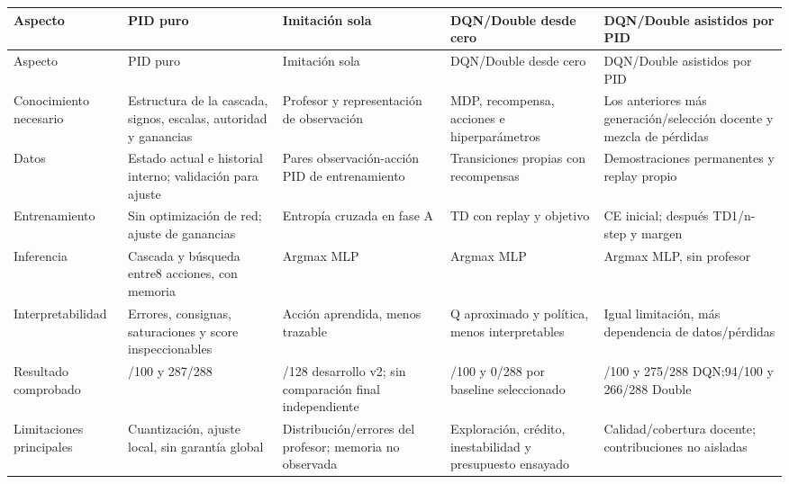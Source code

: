 \documentclass[12pt,a4paper]{article}
\begin{document}
\begingroup
\setlength{\tabcolsep}{3pt}
\renewcommand{\arraystretch}{1.35}
\fontsize{9.1}{11.8}\selectfont
\begin{longtable}{>{\raggedright\arraybackslash}p{0.2400\dimexpr\linewidth-30pt\relax}>{\raggedright\arraybackslash}p{0.1900\dimexpr\linewidth-30pt\relax}>{\raggedright\arraybackslash}p{0.1900\dimexpr\linewidth-30pt\relax}>{\raggedright\arraybackslash}p{0.1900\dimexpr\linewidth-30pt\relax}>{\raggedright\arraybackslash}p{0.1900\dimexpr\linewidth-30pt\relax}}
\toprule
\rowcolor{Pale}Aspecto & PID puro & Imitación sola & DQN/\allowbreak{}Double desde cero & DQN/\allowbreak{}Double asistidos por PID \\
\midrule
\endfirsthead
\toprule
\rowcolor{Pale}Aspecto & PID puro & Imitación sola & DQN/\allowbreak{}Double desde cero & DQN/\allowbreak{}Double asistidos por PID \\
\midrule
\endhead
\bottomrule\endfoot
Conocimiento necesario & Estructura de la cascada,\allowbreak{} signos,\allowbreak{} escalas,\allowbreak{} autoridad y ganancias & Profesor y representación de observación & MDP,\allowbreak{} recompensa,\allowbreak{} acciones e hiperparámetros & Los anteriores más generación/\allowbreak{}selección docente y mezcla de pérdidas \\
Datos & Estado actual e historial interno; validación para ajuste & Pares observación-acción PID de entrenamiento & Transiciones propias con recompensas & Demostraciones permanentes y replay propio \\
Entrenamiento & Sin optimización de red; ajuste de ganancias & Entropía cruzada en fase A & TD con replay y objetivo & CE inicial; después TD1/\allowbreak{}n-step y margen \\
Inferencia & Cascada y búsqueda entre8 acciones,\allowbreak{} con memoria & Argmax MLP & Argmax MLP & Argmax MLP,\allowbreak{} sin profesor \\
Interpretabilidad & Errores,\allowbreak{} consignas,\allowbreak{} saturaciones y score inspeccionables & Acción aprendida,\allowbreak{} menos trazable & Q aproximado y política,\allowbreak{} menos interpretables & Igual limitación,\allowbreak{} más dependencia de datos/\allowbreak{}pérdidas \\
Resultado comprobado & 98/\allowbreak{}100 y 287/\allowbreak{}288 & 119/\allowbreak{}128 desarrollo v2; sin comparación final independiente & 0/\allowbreak{}100 y 0/\allowbreak{}288 por baseline seleccionado & 96/\allowbreak{}100 y 275/\allowbreak{}288 DQN;94/\allowbreak{}100 y 266/\allowbreak{}288 Double \\
Limitaciones principales & Cuantización,\allowbreak{} ajuste local,\allowbreak{} sin garantía global & Distribución/\allowbreak{}errores del profesor; memoria no observada & Exploración,\allowbreak{} crédito,\allowbreak{} inestabilidad y presupuesto ensayado & Calidad/\allowbreak{}cobertura docente; contribuciones no aisladas \\
\end{longtable}
\end{document}
